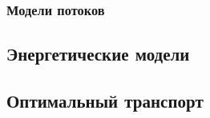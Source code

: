 

\subsubsection{Модели потоков}


\subsection{Энергетические модели}



\subsection{Оптимальный транспорт}



